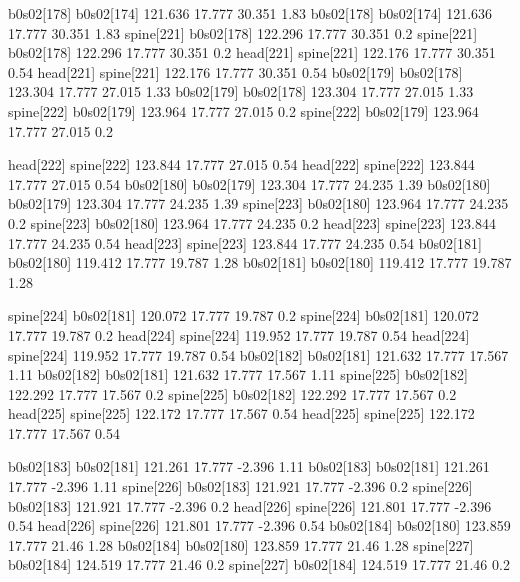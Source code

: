 b0s02[178]    b0s02[174]    121.636    17.777    30.351    1.83
b0s02[178]    b0s02[174]    121.636    17.777    30.351    1.83
spine[221]    b0s02[178]    122.296    17.777    30.351    0.2
spine[221]    b0s02[178]    122.296    17.777    30.351    0.2
head[221]    spine[221]    122.176    17.777    30.351    0.54
head[221]    spine[221]    122.176    17.777    30.351    0.54
b0s02[179]    b0s02[178]    123.304    17.777    27.015    1.33
b0s02[179]    b0s02[178]    123.304    17.777    27.015    1.33
spine[222]    b0s02[179]    123.964    17.777    27.015    0.2
spine[222]    b0s02[179]    123.964    17.777    27.015    0.2


head[222]    spine[222]    123.844    17.777    27.015    0.54
head[222]    spine[222]    123.844    17.777    27.015    0.54
b0s02[180]    b0s02[179]    123.304    17.777    24.235    1.39
b0s02[180]    b0s02[179]    123.304    17.777    24.235    1.39
spine[223]    b0s02[180]    123.964    17.777    24.235    0.2
spine[223]    b0s02[180]    123.964    17.777    24.235    0.2
head[223]    spine[223]    123.844    17.777    24.235    0.54
head[223]    spine[223]    123.844    17.777    24.235    0.54
b0s02[181]    b0s02[180]    119.412    17.777    19.787    1.28
b0s02[181]    b0s02[180]    119.412    17.777    19.787    1.28


spine[224]    b0s02[181]    120.072    17.777    19.787    0.2
spine[224]    b0s02[181]    120.072    17.777    19.787    0.2
head[224]    spine[224]    119.952    17.777    19.787    0.54
head[224]    spine[224]    119.952    17.777    19.787    0.54
b0s02[182]    b0s02[181]    121.632    17.777    17.567    1.11
b0s02[182]    b0s02[181]    121.632    17.777    17.567    1.11
spine[225]    b0s02[182]    122.292    17.777    17.567    0.2
spine[225]    b0s02[182]    122.292    17.777    17.567    0.2
head[225]    spine[225]    122.172    17.777    17.567    0.54
head[225]    spine[225]    122.172    17.777    17.567    0.54


b0s02[183]    b0s02[181]    121.261    17.777    -2.396    1.11
b0s02[183]    b0s02[181]    121.261    17.777    -2.396    1.11
spine[226]    b0s02[183]    121.921    17.777    -2.396    0.2
spine[226]    b0s02[183]    121.921    17.777    -2.396    0.2
head[226]    spine[226]    121.801    17.777    -2.396    0.54
head[226]    spine[226]    121.801    17.777    -2.396    0.54
b0s02[184]    b0s02[180]    123.859    17.777    21.46    1.28
b0s02[184]    b0s02[180]    123.859    17.777    21.46    1.28
spine[227]    b0s02[184]    124.519    17.777    21.46    0.2
spine[227]    b0s02[184]    124.519    17.777    21.46    0.2


